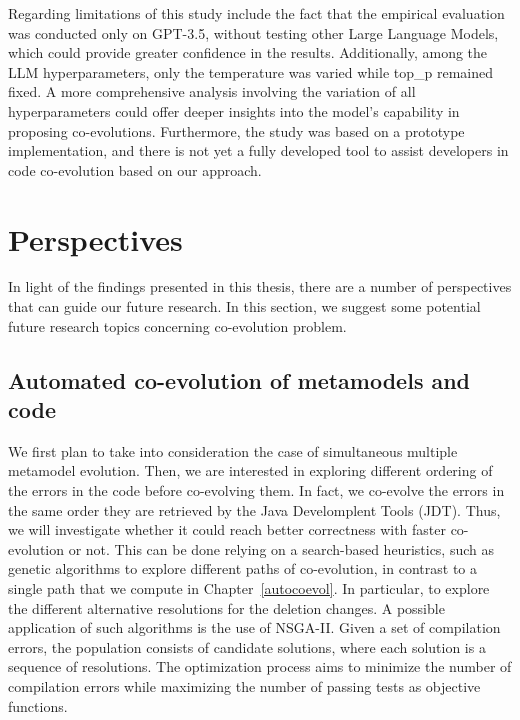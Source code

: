 Regarding limitations of this study include the fact that the empirical evaluation was conducted only on GPT-3.5, without testing other Large Language Models, which could provide greater confidence in the results. Additionally, among the LLM hyperparameters, only the temperature was varied while top\_p remained fixed. A more comprehensive analysis involving the variation of all hyperparameters could offer deeper insights into the model's capability in proposing co-evolutions. Furthermore, the study was based on a prototype implementation, and there is not yet a fully developed tool to assist developers in code co-evolution based on our approach.
\section{Perspectives}
In light of the findings presented in this thesis, there are a number of perspectives that can guide our future research. In this section, we suggest some potential future research topics concerning co-evolution problem.

\subsection{Automated co-evolution of metamodels and code}

We first plan to take into consideration the case of simultaneous multiple metamodel evolution. 
Then, we are interested in exploring different ordering of the errors in the code before co-evolving them. In fact, we co-evolve the errors in the same order they are retrieved by the Java Develomplent Tools (JDT). Thus, we will investigate whether it could reach better correctness with faster co-evolution or not. 
This can be done relying on a search-based heuristics, such as genetic algorithms to explore different paths of co-evolution, in contrast to a single path that we compute in Chapter~\ref{autocoevol}. In particular, to explore the different alternative resolutions for the deletion changes. A possible application of such algorithms is the use of NSGA-II. Given a set of compilation errors, the population consists of candidate solutions, where each solution is a sequence of resolutions. The optimization process aims to minimize the number of compilation errors while maximizing the number of passing tests as objective functions.

